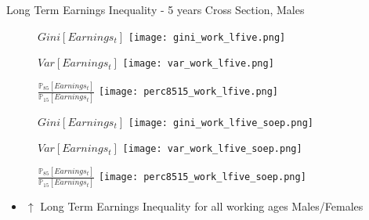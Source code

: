 \documentclass{beamer}
\begin{document}
\begin{frame}{Long Term Earnings Inequality  - 5 years Cross Section, Males }
\begin{figure}[!t]
\centering
\begin{minipage}[b]{0.32\textwidth}{$Gini[Earnings_t]$}
\centering
\texttt{[image: gini\_work\_lfive.png]}
\end{minipage}
\begin{minipage}[b]{0.32\textwidth}{$Var[Earnings_t]$}
\centering
\texttt{[image: var\_work\_lfive.png]}
\end{minipage}
\begin{minipage}[b]{0.32\textwidth}{$\frac{\mathbb{P}_{85}[Earnings_t]}{\mathbb{P}_{15}[Earnings_t]}$}
\centering
\texttt{[image: perc8515\_work\_lfive.png]}
\end{minipage}
\begin{minipage}[b]{0.32\textwidth}{$Gini[Earnings_t]$}
\centering
\texttt{[image: gini\_work\_lfive\_soep.png]}
\end{minipage}
\begin{minipage}[b]{0.32\textwidth}{$Var[Earnings_t]$}
\centering
\texttt{[image: var\_work\_lfive\_soep.png]}
\end{minipage}
\begin{minipage}[b]{0.32\textwidth}{$\frac{\mathbb{P}_{85}[Earnings_t]}{\mathbb{P}_{15}[Earnings_t]}$}
\centering
\texttt{[image: perc8515\_work\_lfive\_soep.png]}
\end{minipage}
\end{figure}
\begin{itemize}
\setlength{\itemsep}{0.7 cm}
\item $\uparrow$ Long Term Earnings Inequality for all working ages Males/Females
\end{itemize}
\end{frame}
\end{document}
